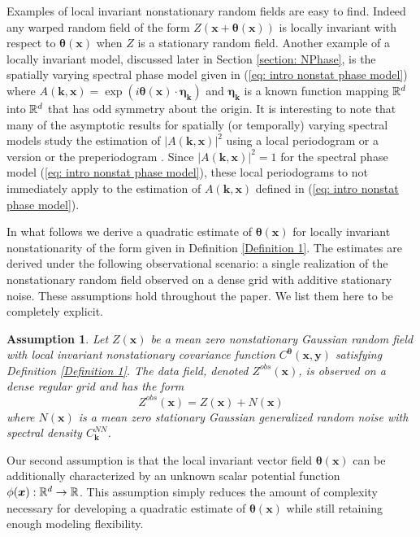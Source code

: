\documentclass[10pt,noinfoline]{imsart}
\newtheorem{assumption}{Assumption}
\newcommand{\bs}{\boldsymbol}
\begin{document}
Examples of local invariant nonstationary random fields are easy to find. Indeed any warped random field of the form $Z(\bs x + \bs \theta(\bs x))$ is locally invariant with respect to $\bs\theta(\bs x)$ when $Z$ is a stationary random field. Another example of a locally invariant model, discussed later in Section \ref{section: NPhase}, is the spatially varying spectral phase model given in (\ref{eq: intro nonstat phase model}) where $A(\bs k,\bs x)=\exp(i\bs\theta(\bs x) \cdot \bs\eta_{\bs k})$ and $\bs \eta_{\bs k}$ is a known function mapping $\Bbb R^d$ into $\Bbb R^d$ that has odd symmetry about the origin. It is interesting to note that many of the asymptotic results for spatially (or temporally) varying spectral models study the estimation of $|A(\bs k, \bs x)|^2$ using a local periodogram \cite{dahlhaus1997fitting} or a version or the preperiodogram \cite{dahlhaus2000likelihood}. Since  $|A(\bs k, \bs x)|^2 = 1$ for the spectral phase model (\ref{eq: intro nonstat phase model}), these local periodograms to not immediately apply to the estimation of $A(\bs k, \bs x)$ defined in (\ref{eq: intro nonstat phase model}).


In what follows we derive a quadratic estimate of $\bs\theta(\bs x)$ for locally invariant nonstationarity of the form given in Definition \ref{Definition 1}. The estimates are derived under the following observational scenario: a single realization of the nonstationary random field observed on a dense grid with additive stationary noise. These assumptions hold throughout the paper. We list them here to be completely explicit.


\begin{assumption}\label{Assumption 4}
Let $Z(\bs x)$ be a mean zero nonstationary Gaussian random field with local invariant nonstationary covariance function $C^{\bs \theta}(\bs x, \bs y)$ satisfying Definition \ref{Definition 1}. The data field, denoted $Z^{obs}(\bs x)$, is observed on a dense regular grid and has the form
\[
Z^{obs}(\bs x) = Z(\bs x) + N(\bs x)
\]
where  $N(\bs x)$ is a mean zero stationary Gaussian generalized random noise with spectral density $C_{\bs k}^{N\!N}$.
\end{assumption}

Our second assumption is that the local invariant vector field $\bs \theta(\bs x)$ can be additionally characterized by an unknown scalar potential function $\phi(\bs x):\Bbb R^d \rightarrow \Bbb R$. This assumption simply  reduces the amount of complexity necessary for  developing a quadratic estimate of $\bs \theta(\bs x)$ while still retaining enough modeling flexibility.
\end{document}
